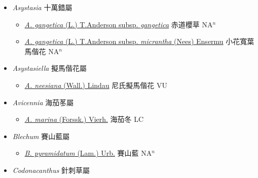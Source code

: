 
  \begin{itemize}
 \item[] \textit{Asystasia} 十萬錯屬
                    
  \begin{itemize}
        \item[] \href{http://www.theplantlist.org/tpl1.1/search?q=Asystasia+gangetica+subsp.+gangetica}{\textit{A. gangetica} (L.) T.Anderson subsp. \textit{gangetica}}   赤道櫻草 NA$^n$
        \item[] \href{http://www.theplantlist.org/tpl1.1/search?q=Asystasia+gangetica+subsp.+micrantha}{\textit{A. gangetica} (L.) T.Anderson subsp. \textit{micrantha} (Nees) Ensermu}   小花寬葉馬偕花 NA$^n$
  \end{itemize}
 \item[] \textit{Asystasiella} 擬馬偕花屬
                    
  \begin{itemize}
        \item[] \href{http://www.theplantlist.org/tpl1.1/search?q=Asystasiella+neesiana}{\textit{A. neesiana} (Wall.) Lindau}   尼氏擬馬偕花 VU
  \end{itemize}
 \item[] \textit{Avicennia} 海茄苳屬
                    
  \begin{itemize}
        \item[] \href{http://www.theplantlist.org/tpl1.1/search?q=Avicennia+marina}{\textit{A. marina} (Forssk.) Vierh.}   海茄冬 LC
  \end{itemize}
 \item[] \textit{Blechum} 賽山藍屬
                    
  \begin{itemize}
        \item[] \href{http://www.theplantlist.org/tpl1.1/search?q=Blechum+pyramidatum}{\textit{B. pyramidatum} (Lam.) Urb.}   賽山藍 NA$^n$
  \end{itemize}
 \item[] \textit{Codonacanthus} 針刺草屬
                    

\end{itemize}
